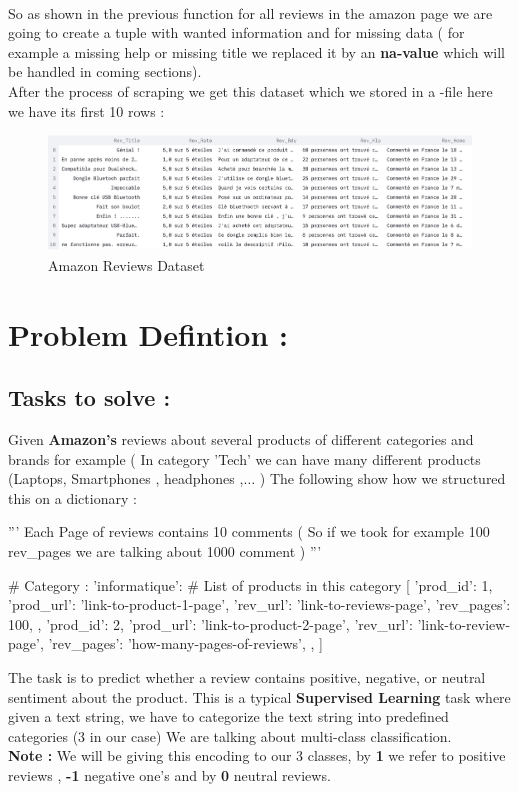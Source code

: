 \documentclass{article}
\begin{document}
\noindent\\
So as shown in the previous function for all reviews in the amazon page we are going to create a tuple with wanted information and for missing data ( for example a missing help or missing title we replaced it by an \textbf{na-value} which will be handled in coming sections).\\
After the process of scraping we get this dataset which we stored in a -file here we have its first 10 rows :
\begin{figure}[H]
    \centering
    \includegraphics[scale=0.46]{src/img/dataset.png}
    \caption{Amazon Reviews Dataset}
    \label{fig:my_label}
\end{figure}

\section{Problem Defintion :}
\subsection{Tasks to solve :}
Given \textbf{Amazon's} reviews about several products of different categories and brands for example ( In category 'Tech' we can have many different products (Laptops, Smartphones , headphones ,$\dots$ ) The following show how we structured this on a dictionary :  \\
\begin{code}
'''
    Each Page of reviews contains 10 comments ( So if we took for
     example 100 rev_pages we are talking about 1000 comment )
'''

{
    # Category :
    'informatique':
    # List of products in this category
    [
        {
            'prod_id': 1,
            'prod_url': 'link-to-product-1-page',
            'rev_url': 'link-to-reviews-page',
            'rev_pages': 100,
        },
        {
            'prod_id': 2,
            'prod_url': 'link-to-product-2-page',
            'rev_url': 'link-to-review-page',
            'rev_pages': 'how-many-pages-of-reviews',
        },
    ]
}
\end{code}
\noindent The task is to predict whether a review  contains positive, negative, or neutral sentiment about the product. This is a typical \textbf{Supervised Learning} task where given a text string, we have to categorize the text string into predefined categories (3 in our case) We are talking about multi-class classification.\\
\textbf{Note : } We will be giving this encoding to our 3 classes, by \textbf{1} we refer to positive reviews , \textbf{-1} negative one's and by \textbf{0} neutral reviews.
\end{document}
